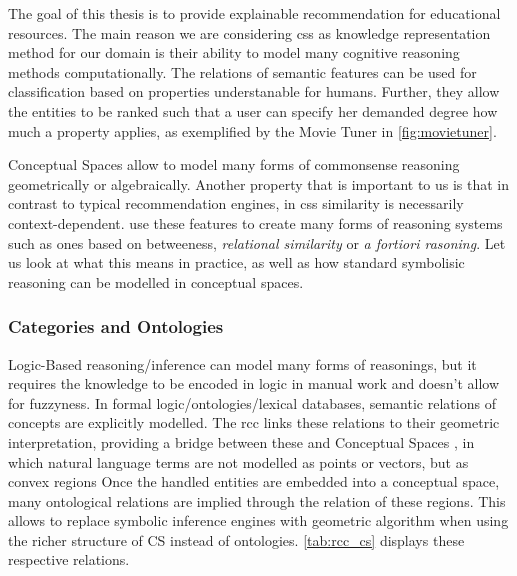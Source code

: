The goal of this thesis is to provide explainable recommendation for educational resources. The main reason we are considering \glspl{cs} as knowledge representation method for our domain is their ability to model many cognitive reasoning methods computationally. The relations of semantic features can be used for classification based on properties understanable for humans. Further, they allow the entities to be ranked such that a user can specify her demanded degree how much a property applies, as exemplified by the Movie Tuner in \autoref{fig:movietuner}. 

Conceptual Spaces allow to model many forms of commonsense reasoning geometrically or algebraically. Another property that is important to us is that in contrast to typical recommendation engines, in \glspl{cs} similarity is necessarily context-dependent. \textcite{Derrac2015} use these features to create many forms of reasoning systems such as ones based on betweeness, \textit{relational similarity} or \textit{a fortiori rasoning}. Let us look at what this means in practice, as well as how standard symbolisic reasoning can be modelled in conceptual spaces.



\subsubsection*{Categories and Ontologies}
\label{sec:ontology_rcc}

Logic-Based reasoning/inference can model many forms of reasonings, but it requires the knowledge to be encoded in logic in manual work and doesn't allow for fuzzyness.
In formal logic/ontologies/lexical databases, semantic relations of concepts are explicitly modelled. The \gls{rcc} \cite{Cohn1997a} links these relations to their geometric interpretation, providing a bridge between these and Conceptual Spaces \cite{Gardenfors2001}, in which natural language terms are not modelled as points or vectors, but as convex regions Once the handled entities are embedded into a conceptual space, many ontological relations are implied through the relation of these regions. This allows to replace symbolic inference engines with geometric algorithm when using the richer structure of CS instead of ontologies. \autoref{tab:rcc_cs} displays these respective relations.

